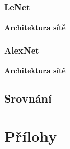 \documentclass[10pt,a4paper]{article}
\begin{document}
\subsubsection{LeNet}
\paragraph{Architektura sítě}
\subsubsection{AlexNet}
\paragraph{Architektura sítě}


\subsection{Srovnání}

\clearpage
\section*{Přílohy}
\end{document}
